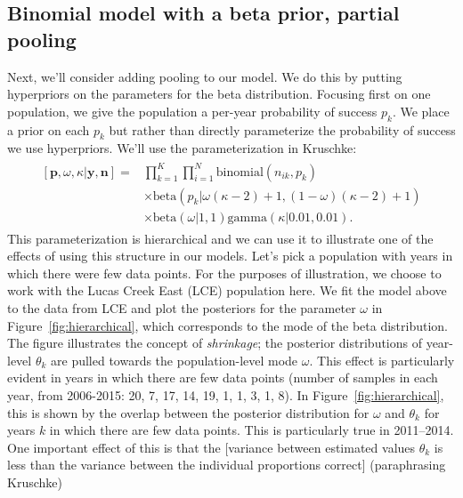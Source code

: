 \documentclass[12pt, oneside, titlepage]{article}   	%
\begin{document}
\subsection*{Binomial model with a beta prior, partial pooling}

Next, we'll consider adding pooling to our model. We do this by putting hyperpriors on the parameters for the beta distribution. Focusing first on one population, we give the population a per-year probability of success $p_k$. We place a prior on each $p_{k}$ but rather than directly parameterize the probability of success we use hyperpriors. We'll use the parameterization in Kruschke:
%
\begin{align}
  \begin{split}
[\bm{p},\omega,\kappa|\bm{y},\bm{n}]  = & \prod_{k=1}^K\prod_{i=1}^N \mathrm{binomial}(n_{ik},p_{k}) 
    \\ & \times \mathrm{beta} (  p_{k} | \omega(\kappa-2) +1 , (1-\omega) (\kappa -2) + 1) 
    \\ & \times \mathrm{beta} ( \omega | 1, 1) \mathrm{gamma} ( \kappa | 0.01, 0.01)  .
  \end{split}
\end{align}
%
This parameterization is hierarchical and we can use it to illustrate one of the effects of using this structure in our models. Let's pick a population with years in which there were few data points. For the purposes of illustration, we choose to work with the Lucas Creek East (LCE) population here. We fit the model above to the data from LCE and plot the posteriors for the parameter $\omega$ in Figure~\ref{fig:hierarchical}, which corresponds to the mode of the beta distribution. The figure illustrates the concept of \textit{shrinkage}; the posterior distributions of year-level $\theta_k$ are pulled towards the population-level mode $\omega$. This effect is particularly evident in years in which there are few data points (number of samples in each year, from 2006-2015: 20, 7, 17, 14, 19, 1, 1, 3, 1, 8). In Figure~\ref{fig:hierarchical}, this is shown by the overlap between the posterior distribution for $\omega$ and $\theta_k$ for years $k$ in which there are few data points. This is particularly true in 2011--2014. One important effect of this is that the [variance between estimated values $\theta_k$ is less than the variance between the individual proportions correct] (paraphrasing Kruschke)
\end{document}
